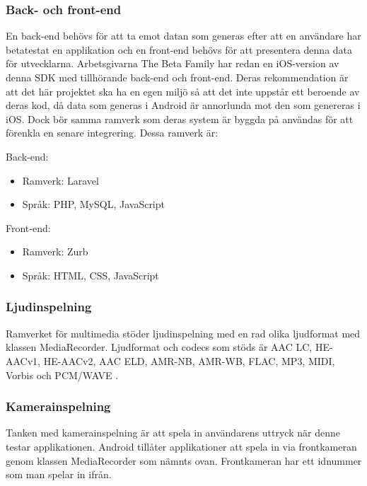\subsubsection{Back- och front-end}
\label{subsubsec:backfront}
En back-end behövs för att ta emot datan som generas efter att en användare har betatestat en applikation och en front-end behövs för att presentera denna data för utvecklarna. Arbetsgivarna The Beta Family har redan en iOS-version av denna SDK med tillhörande back-end och front-end. Deras rekommendation är att det här projektet ska ha en egen miljö så att det inte uppstår ett beroende av deras kod, då data som generas i Android är annorlunda mot den som genereras i iOS. Dock bör samma ramverk som deras system är byggda på användas för att förenkla en senare integrering. Dessa ramverk är:


Back-end:
\begin{itemize}
	\item Ramverk: Laravel
	\item Språk: PHP, MySQL, JavaScript
\end{itemize}

Front-end:
\begin{itemize}
	\item Ramverk: Zurb
	\item Språk: HTML, CSS, JavaScript
\end{itemize}

\subsubsection{Ljudinspelning}
\label{subsubsec:ljudinspelning}
Ramverket för multimedia stöder ljudinspelning med en rad olika ljudformat med klassen MediaRecorder. Ljudformat och codecs som stöds är AAC LC, HE-AACv1, HE-AACv2, AAC ELD, AMR-NB, AMR-WB, FLAC, MP3, MIDI, Vorbis och PCM/WAVE \parencite{sound}.

\subsubsection{Kamerainspelning}
\label{subsubsec:kamerainspelning}
Tanken med kamerainspelning är att spela in användarens uttryck när denne testar applikationen. Android tillåter applikationer att spela in via frontkameran genom klassen MediaRecorder \parencite{frontcamera} som nämnts ovan. Frontkameran har ett idnummer som man spelar in ifrån.
